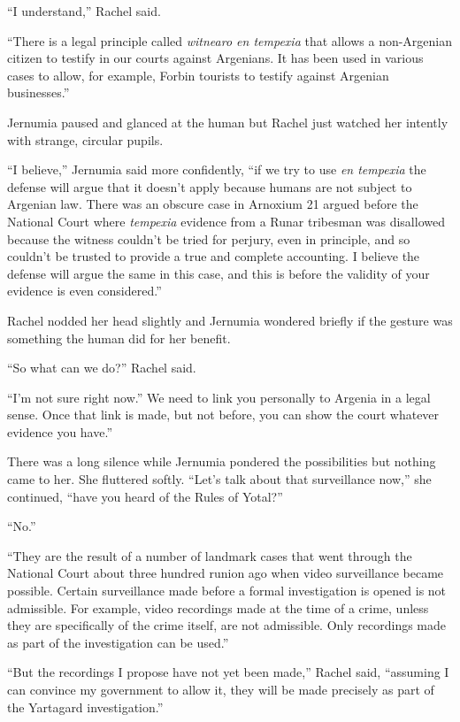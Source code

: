 ``I understand,'' Rachel said.

``There is a legal principle called \textit{witnearo en tempexia} that allows a non-Argenian
citizen to testify in our courts against Argenians. It has been used in various cases to allow,
for example, Forbin tourists to testify against Argenian businesses.''

Jernumia paused and glanced at the human but Rachel just watched her intently with strange,
circular pupils.

``I believe,'' Jernumia said more confidently, ``if we try to use \textit{en tempexia} the
defense will argue that it doesn't apply because humans are not subject to Argenian law. There
was an obscure case in Arnoxium 21 argued before the National Court where \textit{tempexia}
evidence from a Runar tribesman was disallowed because the witness couldn't be tried for
perjury, even in principle, and so couldn't be trusted to provide a true and complete
accounting. I believe the defense will argue the same in this case, and this is before the
validity of your evidence is even considered.''

Rachel nodded her head slightly and Jernumia wondered briefly if the gesture was something the
human did for her benefit.

``So what can we do?'' Rachel said.

``I'm not sure right now.'' We need to link you personally to Argenia in a legal sense. Once
that link is made, but not before, you can show the court whatever evidence you have.''

There was a long silence while Jernumia pondered the possibilities but nothing came to her. She
fluttered softly. ``Let's talk about that surveillance now,'' she continued, ``have you heard of
the Rules of Yotal?''

``No.''

``They are the result of a number of landmark cases that went through the National Court about
three hundred runion ago when video surveillance became possible. Certain surveillance made
before a formal investigation is opened is not admissible. For example, video recordings made at
the time of a crime, unless they are specifically of the crime itself, are not admissible. Only
recordings made as part of the investigation can be used.''

``But the recordings I propose have not yet been made,'' Rachel said, ``assuming I can convince
my government to allow it, they will be made precisely as part of the Yartagard investigation.''

